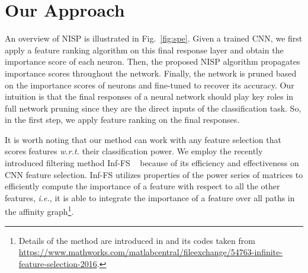 \documentclass[10pt,twocolumn,letterpaper]{article}
\def\ie{\emph{i.e.}}
\def\wrt{\emph{w.r.t.} }
\begin{document}
\section{Our Approach}%
An overview of NISP is illustrated in Fig.~\ref{fig:spe}. Given a trained CNN, we first apply a feature ranking algorithm on this final response layer and obtain the importance score of each neuron. Then, the proposed NISP algorithm propagates importance scores throughout the network. 
Finally, the network is pruned based on the importance scores of neurons and fine-tuned to recover its accuracy.
Our intuition is that the final responses of a neural network should play key roles in full network pruning since they are the direct inputs of the classification task. So, in the first step, we apply feature ranking on the final responses.

It is worth noting that our method can work with any feature selection that scores features \wrt their classification power. We employ the recently introduced filtering method Inf-FS ~\cite{Roffo_2015_ICCV} because of its efficiency and effectiveness on CNN feature selection. 
Inf-FS utilizes properties of the power series of matrices to efficiently compute the  importance of a feature with respect to all the other features, \ie, it is able to integrate the importance of a feature over all paths in the affinity graph\footnote{Details of the method are introduced in \cite{Roffo_2015_ICCV} and its codes taken from {\scriptsize\url{https://www.mathworks.com/matlabcentral/fileexchange/54763-infinite-feature-selection-2016}}.}. 
\end{document}
